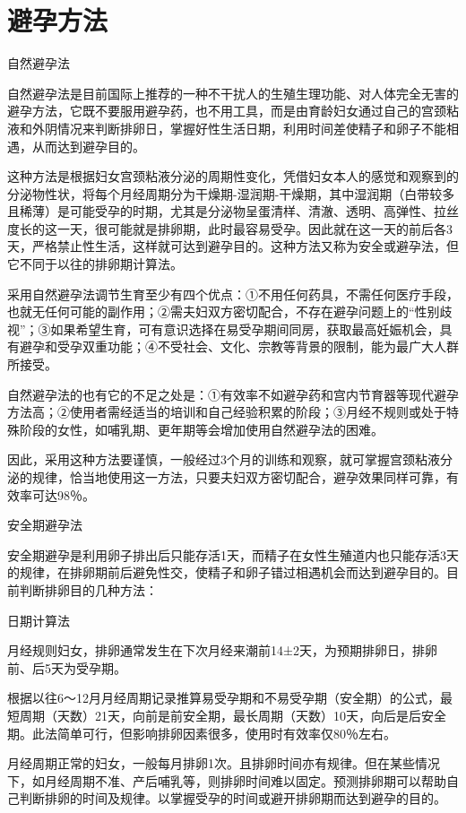 \documentclass[12pt,UTF8,openany]{ctexbook}
\begin{document}
\chapter{避孕方法}


自然避孕法


自然避孕法是目前国际上推荐的一种不干扰人的生殖生理功能、对人体完全无害的避孕方法，它既不要服用避孕药，也不用工具，而是由育龄妇女通过自己的宫颈粘液和外阴情况来判断排卵日，掌握好性生活日期，利用时间差使精子和卵子不能相遇，从而达到避孕目的。

这种方法是根据妇女宫颈粘液分泌的周期性变化，凭借妇女本人的感觉和观察到的分泌物性状，将每个月经周期分为干燥期-湿润期-干燥期，其中湿润期（白带较多且稀薄）是可能受孕的时期，尤其是分泌物呈蛋清样、清澈、透明、高弹性、拉丝度长的这一天，很可能就是排卵期，此时最容易受孕。因此就在这一天的前后各3天，严格禁止性生活，这样就可达到避孕目的。这种方法又称为安全或避孕法，但它不同于以往的排卵期计算法。

采用自然避孕法调节生育至少有四个优点：①不用任何药具，不需任何医疗手段，也就无任何可能的副作用；②需夫妇双方密切配合，不存在避孕问题上的“性别歧视”；③如果希望生育，可有意识选择在易受孕期间同房，获取最高妊娠机会，具有避孕和受孕双重功能；④不受社会、文化、宗教等背景的限制，能为最广大人群所接受。

自然避孕法的也有它的不足之处是：①有效率不如避孕药和宫内节育器等现代避孕方法高；②使用者需经适当的培训和自己经验积累的阶段；③月经不规则或处于特殊阶段的女性，如哺乳期、更年期等会增加使用自然避孕法的困难。

因此，采用这种方法要谨慎，一般经过3个月的训练和观察，就可掌握宫颈粘液分泌的规律，恰当地使用这一方法，只要夫妇双方密切配合，避孕效果同样可靠，有效率可达98％。





安全期避孕法


安全期避孕是利用卵子排出后只能存活1天，而精子在女性生殖道内也只能存活3天的规律，在排卵期前后避免性交，使精子和卵子错过相遇机会而达到避孕目的。目前判断排卵目的几种方法：

日期计算法

月经规则妇女，排卵通常发生在下次月经来潮前14±2天，为预期排卵日，排卵前、后5天为受孕期。

根据以往6～12月月经周期记录推算易受孕期和不易受孕期（安全期）的公式，最短周期（天数）21天，向前是前安全期，最长周期（天数）10天，向后是后安全期。此法简单可行，但影响排卵因素很多，使用时有效率仅80％左右。

月经周期正常的妇女，一般每月排卵1次。且排卵时间亦有规律。但在某些情况下，如月经周期不准、产后哺乳等，则排卵时间难以固定。预测排卵期可以帮助自己判断排卵的时间及规律。以掌握受孕的时间或避开排卵期而达到避孕的目的。
\end{document}

